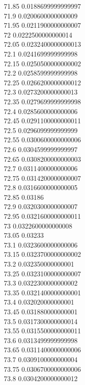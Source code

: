 {71.85	0.0188699999999997\\
71.9	0.0200600000000009\\
71.95	0.0211900000000007\\
72	0.0222500000000014\\
72.05	0.0232400000000013\\
72.1	0.0241699999999998\\
72.15	0.0250500000000002\\
72.2	0.0258599999999998\\
72.25	0.0266200000000012\\
72.3	0.0273200000000013\\
72.35	0.0279699999999998\\
72.4	0.0285600000000006\\
72.45	0.0291100000000011\\
72.5	0.0296099999999999\\
72.55	0.0300600000000006\\
72.6	0.0304599999999997\\
72.65	0.0308200000000003\\
72.7	0.0311400000000006\\
72.75	0.0314200000000007\\
72.8	0.0316600000000005\\
72.85	0.03186\\
72.9	0.0320300000000007\\
72.95	0.0321600000000011\\
73	0.0322600000000008\\
73.05	0.03233\\
73.1	0.0323600000000006\\
73.15	0.0323700000000002\\
73.2	0.032350000000001\\
73.25	0.0323100000000007\\
73.3	0.0322300000000002\\
73.35	0.0321400000000001\\
73.4	0.032020000000001\\
73.45	0.031880000000001\\
73.5	0.0317300000000014\\
73.55	0.0315500000000011\\
73.6	0.0313499999999998\\
73.65	0.0311400000000006\\
73.7	0.0309100000000004\\
73.75	0.0306700000000006\\
73.8	0.0304200000000012\\
}
